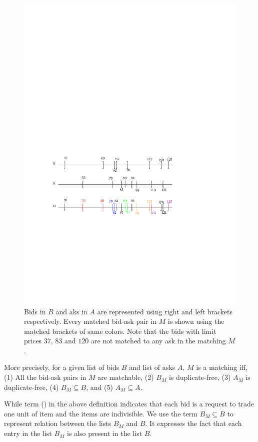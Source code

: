 \documentclass[a4paper,UKenglish,cleveref, autoref]{lipics-v2019}
\begin{document}
\begin{figure}[h!]
\centering
\includegraphics[width=.8\textwidth]{brack_matching.pdf}
\caption{ Bids in $B$ and aks in $A$ are represented using right and left brackets respectively. Every matched bid-ask pair in $M$ is shown using the matched brackets of same colors. Note that the bids with limit prices $37$, $83$ and $120$ are not matched to any ask in the matching $M$.}
\label{fig:matching}
\end{figure}

More precisely, for a given list of bids $B$ and list of asks $A$, $M$ is a matching iff, (1) All the bid-ask pairs in $M$ are matchable, (2) $B_M$ is duplicate-free, (3) $A_M$ is duplicate-free, (4) $B_M \subseteq B$, and (5) $A_M \subseteq A$.

\begin{definition}
\end{definition}
\begin{definition}
\end{definition}
While term (\emph{}) in the above definition indicates that each bid is a request to trade one unit of item and the items are indivisible.  We use the term $B_M \subseteq B$  to represent  relation between the lists $B_M$ and $B$. It expresses the fact that each entry in the list $B_M$ is also present in the list $B$.
\end{document}
